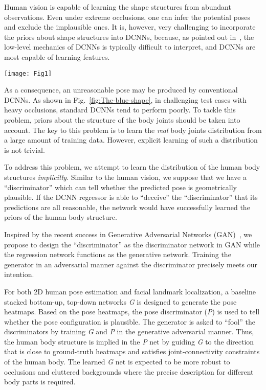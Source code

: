 \documentclass[10pt,journal,compsoc]{IEEEtran}
\begin{document}
Human vision is capable of learning the shape structures from abundant observations.
Even under extreme occlusions, one can infer the potential poses and exclude the implausible ones.
It is, however, very challenging to incorporate the priors about shape structures into DCNNs, because, as pointed out in~\cite{conf/nips/TompsonJLB14}, the low-level mechanics of DCNNs is typically difficult to interpret, and DCNNs are most capable of learning features.

\begin{figure*}[!t]
\centering
\texttt{[image: Fig1]}
%
\caption{\textbf{Motivation}. We show the importance of strongly enforcing priors about the pose structure during training of DCNNs for pose estimation. Learning without using such priors generates inaccurate results.}
\label{fig:The-blue-shape}
\end{figure*}

As a consequence, an unreasonable pose may be produced by conventional DCNNs.
As shown in Fig.~\ref{fig:The-blue-shape}, in challenging test cases with heavy occlusions, standard DCNNs tend to perform poorly.
To tackle this problem, priors about the structure of the body joints should be taken into account.
The key to this problem is to learn the {\em real} body joints distribution from a large amount of training data.
However, explicit learning of such a distribution is not trivial.

To address this problem, we attempt to learn the distribution of the human body structures {\em implicitly}.
Similar to the human vision, we suppose that we have a ``discriminator'' which can tell whether the predicted pose is geometrically plausible.
If the DCNN regressor is able to ``deceive'' the ``discriminator'' that its predictions are all reasonable, the network would have successfully learned the priors of the human body structure.

Inspired by the recent success in Generative Adversarial Networks (GAN)~\cite{journals/corr/RadfordMC15,journals/corr/ZhaoML16,conf/nips/SalimansGZCRCC16,conf/nips/GoodfellowPMXWOCB14,conf/nips/DentonCSF15}, we propose to design the ``discriminator'' as the discriminator network in GAN while the regression network functions as the generative network.
Training the generator in an adversarial manner against the discriminator precisely meets our intention.


For both 2D human pose estimation and facial landmark localization, a baseline stacked bottom-up, top-down networks \textit{G} is designed to generate the pose heatmaps.
Based on the pose heatmaps, the pose discriminator (\textit{P}) is used to tell whether the pose configuration is plausible.
%
%
%
%
%
The generator is asked to ``fool'' the discriminators by training \textit{G} and \textit{P} in the generative adversarial manner.
Thus, the human body structure is implied in the \textit{P} net by guiding \textit{G} to the direction that is close to ground-truth heatmaps and satisfies joint-connectivity constraints of the human body.
The learned \textit{G} net is expected to be more robust to occlusions and cluttered backgrounds where the precise description for different body parts is required.
\end{document}
